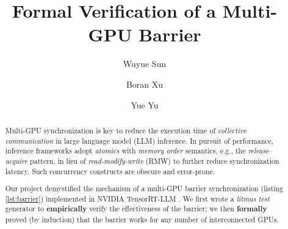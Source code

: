 \documentclass[acmsmall]{acmart}
\begin{document}
\title{Formal Verification of a Multi-GPU Barrier}


\author{Wuyue Sun}

\author{Boran Xu}

\author{Yue Yu}


\renewcommand{\shortauthors}{Wuyue Sun, Boran Xu, Yue Yu}

\begin{abstract}

Multi-GPU synchronization is key to reduce the execution time of \textit{collective communication} in large language model (LLM) inference. In pursuit of performance, inference frameworks adopt \textit{atomics} with \textit{memory order} semantics, e.g., the \textit{release}--\textit{acquire} pattern, in lieu of \textit{read-modify-write} (RMW) to further reduce synchronization latency. Such concurrency constructs are obscure and error-prone.

Our project demystified the mechanism of a multi-GPU barrier synchronization (listing \ref{lst:barrier}) implemented in NVIDIA TensorRT-LLM \cite{trt-llm}. We first wrote a \textit{litmus test} generator to \textbf{empirically} verify the effectiveness of the barrier; we then \textbf{formally} proved (by induction) that the barrier works for any number of interconnected GPUs. 

\end{abstract}

\end{document}
